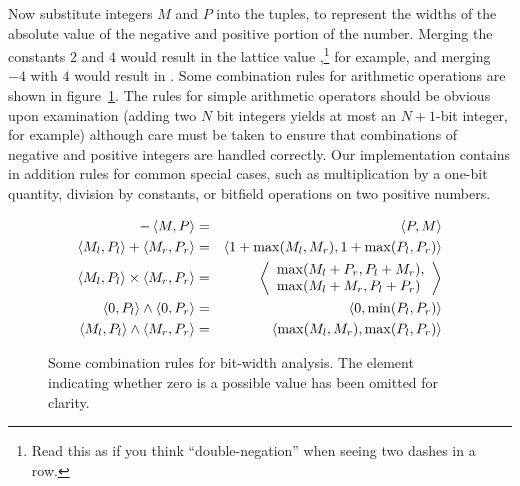 \documentclass[preprint]{acmconf}
\begin{document}
Now substitute integers $M$ and $P$ into the tuples, to represent the
widths of the absolute value of the negative and positive portion of
the number.  Merging the constants $2$ and $4$ would result in the lattice
value ,\footnote{Read this as  if you think
  ``double-negation'' when seeing two dashes in a row.}
for example, and merging $-4$ with $4$ would result in
.  Some combination rules for arithmetic operations are
shown in figure~\ref{fig:bitrules}.  The rules for simple arithmetic
operators should be obvious upon examination (adding two $N$ bit
integers yields at most an $N+1$-bit integer, for example) although
care must be taken to ensure that combinations of negative and
positive integers are handled correctly.  Our implementation contains
in addition rules for common special cases, such as multiplication by
a one-bit quantity, division by constants, or bitfield operations on
two positive numbers.
\begin{figure}
\begin{eqnarray*}
-\left\langle M,P \right\rangle &=& \left\langle P,M \right\rangle\\
\left\langle M_l,P_l \right\rangle + \left\langle M_r,P_r \right\rangle &=& \left\langle 1+\max(M_l,M_r),1+\max(P_l,P_r) \right\rangle\\
\left\langle M_l,P_l \right\rangle \times \left\langle M_r,P_r \right\rangle &=&
\left\langle \begin{array}{l}\max(M_l+P_r,P_l+M_r),\\
                       \max(M_l+M_r,P_l+P_r)\end{array} \right\rangle\\
\left\langle 0,P_l \right\rangle \wedge \left\langle 0,P_r \right\rangle &=& \left\langle 0,\min(P_l,P_r) \right\rangle\\
\left\langle M_l,P_l \right\rangle\wedge \left\langle M_r,P_r \right\rangle &=& \left\langle \max(M_l,M_r),\max(P_l,P_r) \right\rangle
\end{eqnarray*}%
\caption{Some combination rules for bit-width analysis.  The 
  element indicating whether zero is a possible value has been omitted
  for clarity.}\label{fig:bitrules}
\end{figure}
\end{document}
